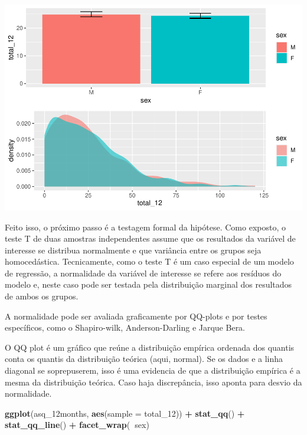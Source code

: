 \documentclass[
]{book}
\newenvironment{Shaded}{\begin{snugshade}}{\end{snugshade}}
\newcommand{\DataTypeTok}[1]{\textcolor[rgb]{0.13,0.29,0.53}{#1}}
\newcommand{\DecValTok}[1]{\textcolor[rgb]{0.00,0.00,0.81}{#1}}
\newcommand{\KeywordTok}[1]{\textcolor[rgb]{0.13,0.29,0.53}{\textbf{#1}}}
\newcommand{\NormalTok}[1]{#1}
\newcommand{\OperatorTok}[1]{\textcolor[rgb]{0.81,0.36,0.00}{\textbf{#1}}}
\newcommand{\StringTok}[1]{\textcolor[rgb]{0.31,0.60,0.02}{#1}}
\begin{document}
\begin{center}\includegraphics{gitbook-demo_files/figure-latex/unnamed-chunk-32-1} \end{center}

Feito isso, o próximo passo é a testagem formal da hipótese. Como exposto, o teste T de duas amostras independentes assume que os resultados da variável de interesse se distribua normalmente e que variância entre os grupos seja homocedástica. Tecnicamente, como o teste T é um caso especial de um modelo de regressão, a normalidade da variável de interesse se refere aos resíduos do modelo e, neste caso pode ser testada pela distribuição marginal dos resultados de ambos os grupos.

A normalidade pode ser avaliada graficamente por QQ-plots e por testes específicos, como o Shapiro-wilk, Anderson-Darling e Jarque Bera.

O QQ plot é um gráfico que reúne a distribuição empírica ordenada dos quantis conta os quantis da distribuição teórica (aqui, normal). Se os dados e a linha diagonal se soprepuserem, isso é uma evidencia de que a distribuição empírica é a mesma da distribuição teórica. Caso haja discrepância, isso aponta para desvio da normalidade.

\begin{Shaded}
\begin{Highlighting}[]
\KeywordTok{ggplot}\NormalTok{(asq_12months, }\KeywordTok{aes}\NormalTok{(}\DataTypeTok{sample =}\NormalTok{ total_}\DecValTok{12}\NormalTok{)) }\OperatorTok{+}\StringTok{ }
\StringTok{  }\KeywordTok{stat_qq}\NormalTok{()  }\OperatorTok{+}\StringTok{ }\KeywordTok{stat_qq_line}\NormalTok{() }\OperatorTok{+}
\StringTok{  }\KeywordTok{facet_wrap}\NormalTok{(}\OperatorTok{~}\NormalTok{sex)}
\end{Highlighting}
\end{Shaded}
\end{document}

